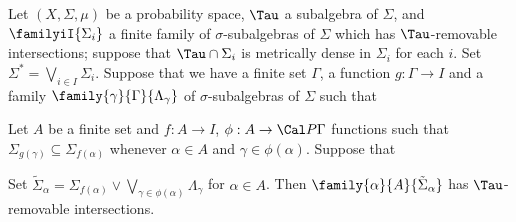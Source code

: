  Let $(X,\Sigma,\mu)$ be a probability space, $\Tau$ a
subalgebra of $\Sigma$, and $\familyiI{\Sigma_i}$ a finite family of
$\sigma$-subalgebras of $\Sigma$ which has $\Tau$-removable intersections;
suppose that $\Tau\cap\Sigma_i$ is metrically dense in $\Sigma_i$ for each
$i$.   Set $\Sigma^*=\bigvee_{i\in I}\Sigma_i$.
Suppose that we have a finite set $\Gamma$, a function $g:\Gamma\to I$ and a family
$\family{\gamma}{\Gamma}{\Lambda_{\gamma}}$ of $\sigma$-subalgebras of $\Sigma$ such that


\noindent Let $A$ be a finite
set and $f:A\to I$, $\phi:A\to\Cal P\Gamma$ functions
such that $\Sigma_{g(\gamma)}\subseteq\Sigma_{f(\alpha)}$ whenever $\alpha\in A$ and
$\gamma\in\phi(\alpha)$.   Suppose that


\noindent Set $\tilde\Sigma_{\alpha}
=\Sigma_{f(\alpha)}\vee\bigvee_{\gamma\in\phi(\alpha)}\Lambda_{\gamma}$
for $\alpha\in A$.   Then $\family{\alpha}{A}{\tilde\Sigma_{\alpha}}$ has
$\Tau$-removable intersections.

